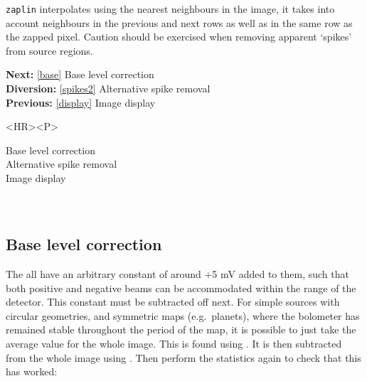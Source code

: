    {\tt zaplin} interpolates using the nearest neighbours in the image,
   it takes into account neighbours in the previous and next rows as well
   as in the same row as the zapped pixel.
   Caution should be exercised when removing apparent
   `spikes' from source regions.

\begin{latexonly}
{\bf Next:} \ref{base} Base level correction\\
{\bf Diversion:} \ref{spikes2} Alternative spike removal\\
{\bf Previous:} \ref{display} Image display\\
\end{latexonly}

\begin{htmlonly}
\begin{rawhtml} <HR><P> \end{rawhtml}
{\bf {}} Base level correction\\
{\bf {}} Alternative spike removal\\
{\bf {}} Image display\\
{\bf {}}\\
{\bf {}}\\
\end{htmlonly}


\subsection{\label{base}Base level correction}

   The
   all have an arbitrary constant of around +5 mV
   added to them, such that both positive and negative beams can be
   accommodated within the range of the detector. This constant must be
   subtracted off next. For simple sources with circular geometries, and
   symmetric maps (e.g.\ planets), where the bolometer has remained
   stable throughout the period of the map, it is possible to just take
   the average value for the whole image. This is found using
{\tt {}}.
   It is then subtracted from the whole image using
{\tt {}}.
   Then perform the statistics again to check that this
   has worked:

